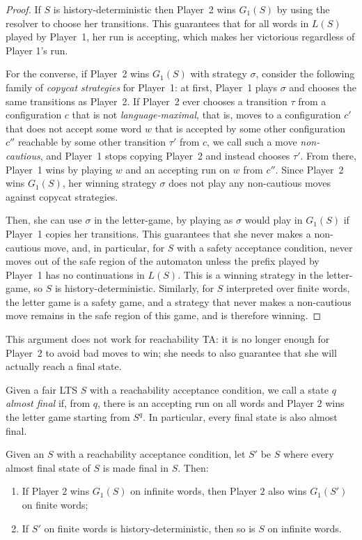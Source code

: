 \documentclass[10pt,a4paper]{amsart}
\theoremstyle{definition}
\numberwithin{equation}{section}
\newcommand{\strat}{\sigma}
\newcommand{\lts}{S}
\begin{document}
   
\begin{proof}
If $\lts$ is history-deterministic then Player~2 wins $G_1(\lts)$ by using the resolver to choose her transitions. This guarantees that for all words in $L(\lts)$ played by Player~1, her run is accepting, which makes her victorious regardless of Player 1's run.


For the converse, if Player~2 wins $G_1(\lts)$ with strategy $\sigma$, consider the following family of \textit{copycat strategies} for Player~1: at first, Player~1 plays $\sigma$ and chooses the same transitions as Player~2.  If Player~2 ever chooses a transition $\tau$ from a configuration $c$ that is not \emph{language-maximal}, that is, moves to a configuration $c'$ that does not accept some word $w$ that is accepted by some other configuration $c''$ reachable by some other transition $\tau'$ from $c$, we call such a move \emph{non-cautious}, and Player~1 stops copying Player~2 and instead chooses $\tau'$. From there, Player~1 wins by playing $w$ and an accepting run on $w$ from $c''$. Since Player~2 wins $G_1(\lts)$, her winning strategy $\strat$ does not play any non-cautious moves against copycat strategies. 

Then, she can use $\strat$ in the letter-game, by playing as $\strat$ would play in $G_1(\lts)$ if Player~1 copies her transitions. This guarantees that she never makes a non-cautious move, and, in particular, for $\lts$ with a safety acceptance condition, never moves out of the safe region of the automaton unless the prefix played by Player~1 has no continuations in $L(\lts)$. This is a winning strategy in the letter-game, so $\lts$ is history-deterministic.
Similarly, for $\lts$ interpreted over finite words, the letter game is a safety game, and a strategy that never makes a non-cautious move remains in the safe region of this game, and is therefore winning.
\end{proof}
 

This argument does not work for reachability TA: it is no longer enough for Player~2 to avoid bad moves to win; she needs to also guarantee that she will actually reach a final state. 


Given a fair LTS $\lts$ with a reachability acceptance condition, we call a state $q$ \textit{almost final} if, from $q$, there is an accepting run on all words and Player $2$ wins the letter game starting from $\lts^q$. In particular, every final state is also almost final.


\begin{lemma}\label{lem:G1reach}
Given an $\lts$ with a reachability acceptance condition, let $\lts'$ be $\lts$ where every almost final state of $\lts$ is made final in $\lts$. Then:
\begin{enumerate}
\item \label{item:inftofin} If Player $2$ wins $G_1(\lts)$ on infinite words, then Player $2$ also wins $G_1(\lts')$ on finite words;
\item \label{item:fintoinf} If $\lts'$ on finite words is history-deterministic, then so is $\lts$ on infinite words.
\end{enumerate} 
\end{lemma}
\end{document}
